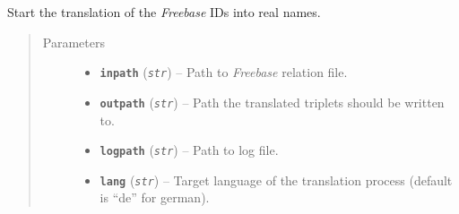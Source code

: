 \documentclass[letterpaper,10pt,english]{sphinxmanual}
\begin{document}
\begin{fulllineitems}
\label{src.prep.relations:src.prep.relations.relations.fetch_relation_triples_of_file}
Start the translation of the \emph{Freebase} IDs into real names.
\begin{quote}\begin{description}
\item[{Parameters}] \leavevmode\begin{itemize}
\item {} 
\textbf{\texttt{inpath}} (\emph{\texttt{str}}) -- Path to \emph{Freebase} relation file.

\item {} 
\textbf{\texttt{outpath}} (\emph{\texttt{str}}) -- Path the translated triplets should be written to.

\item {} 
\textbf{\texttt{logpath}} (\emph{\texttt{str}}) -- Path to log file.

\item {} 
\textbf{\texttt{lang}} (\emph{\texttt{str}}) -- Target language of the translation process (default is ``de'' for german).

\end{itemize}

\end{description}\end{quote}

\end{fulllineitems}

\end{document}
